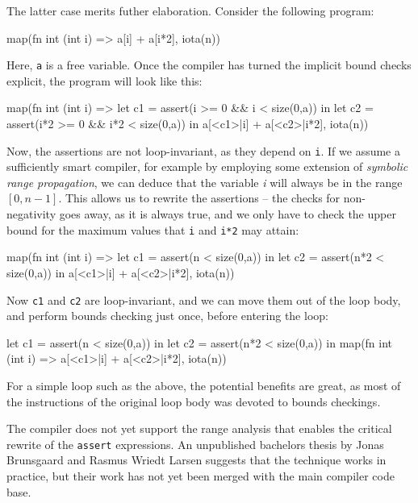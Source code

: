 The latter case merits futher elaboration.  Consider the following
program:

\begin{colorcode}
map(fn int (int i) =>
      a[i] + a[i*2],
    iota(n))
\end{colorcode}

Here, \texttt{a} is a free variable.  Once the compiler has turned the
implicit bound checks explicit, the program will look like this:

\begin{colorcode}
map(fn int (int i) =>
      let c1 = assert(i   >= 0 && i   < size(0,a)) in
      let c2 = assert(i*2 >= 0 && i*2 < size(0,a)) in
      a[<c1>|i] + a[<c2>|i*2],
    iota(n))
\end{colorcode}

Now, the assertions are not loop-invariant, as they depend on
\texttt{i}.  If we assume a sufficiently smart compiler, for example
by employing some extension of \textit{symbolic range
  propagation}\cite{blume1995symbolic}, we can deduce that the
variable \textit{i} will always be in the range $[0,n-1]$.  This
allows us to rewrite the assertions -- the checks for non-negativity
goes away, as it is always true, and we only have to check the upper
bound for the maximum values that \texttt{i} and \texttt{i*2} may
attain:

\begin{colorcode}
map(fn int (int i) =>
      let c1 = assert(n   < size(0,a)) in
      let c2 = assert(n*2 < size(0,a)) in
      a[<c1>|i] + a[<c2>|i*2],
    iota(n))
\end{colorcode}

Now \texttt{c1} and \texttt{c2} are loop-invariant, and we can move
them out of the loop body, and perform bounds checking just once,
before entering the loop:

\begin{colorcode}
let c1 = assert(n   < size(0,a)) in
let c2 = assert(n*2 < size(0,a)) in
map(fn int (int i) =>
      a[<c1>|i] + a[<c2>|i*2],
    iota(n))
\end{colorcode}

For a simple loop such as the above, the potential benefits are great,
as most of the instructions of the original loop body was devoted to
bounds checkings.

The \LO{} compiler does not yet support the range analysis that
enables the critical rewrite of the \texttt{assert} expressions.  An
unpublished bachelors thesis by Jonas Brunsgaard and Rasmus Wriedt
Larsen suggests that the technique works in practice, but their work
has not yet been merged with the main compiler code base.


